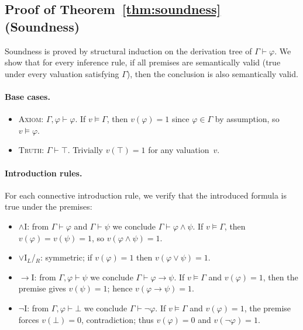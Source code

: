 \documentclass[conference]{IEEEtran}
\newcommand{\proves}{\vdash}
\begin{document}
\subsection{Proof of Theorem~\ref{thm:soundness} (Soundness)}

Soundness is proved by structural induction on the derivation tree of
$\Gamma \proves \varphi$.  We show that for every inference rule, if all
premises are semantically valid (true under every valuation satisfying
$\Gamma$), then the conclusion is also semantically valid.

\paragraph{Base cases.}
\begin{itemize}
  \item \textsc{Axiom}: $\Gamma, \varphi \proves \varphi$.
    If $v \models \Gamma$, then $v(\varphi)=1$ since $\varphi \in \Gamma$
    by assumption, so $v \models \varphi$.

  \item \textsc{Truth}: $\Gamma \proves \top$.
    Trivially $v(\top) = 1$ for any valuation~$v$.
\end{itemize}

\paragraph{Introduction rules.}
For each connective introduction rule, we verify that the introduced
formula is true under the premises:
\begin{itemize}
  \item $\wedge$I: from $\Gamma \proves \varphi$ and $\Gamma \proves \psi$
    we conclude $\Gamma \proves \varphi \wedge \psi$.
    If $v \models \Gamma$, then $v(\varphi)=v(\psi)=1$, so
    $v(\varphi \wedge \psi) = 1$.

  \item $\vee$I$_L$/$_R$: symmetric; if $v(\varphi)=1$ then
    $v(\varphi \vee \psi) = 1$.

  \item $\to$I: from $\Gamma, \varphi \proves \psi$ we conclude
    $\Gamma \proves \varphi \to \psi$.
    If $v \models \Gamma$ and $v(\varphi)=1$, then the premise gives
    $v(\psi)=1$; hence $v(\varphi \to \psi) = 1$.

  \item $\neg$I: from $\Gamma, \varphi \proves \bot$ we conclude
    $\Gamma \proves \neg\varphi$.
    If $v \models \Gamma$ and $v(\varphi)=1$, the premise forces
    $v(\bot)=0$, contradiction; thus $v(\varphi)=0$ and
    $v(\neg\varphi)=1$.
\end{itemize}
\end{document}
